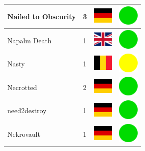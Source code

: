 \documentclass[12pt, a4paper, twoside]{report}
\begin{document}
\begin{center}
\begin{longtable}{|p{5cm}|p{2cm}|p{2cm}|p{2cm}|}
			Nailed to Obscurity & 3 & \includegraphics[width=1cm]{4x3/de} & \includegraphics[width=1cm]{likes/y} \\ \hline
			Napalm Death & 1 & \includegraphics[width=1cm]{4x3/gb} & \includegraphics[width=1cm]{likes/y} \\ \hline
			Nasty & 1 & \includegraphics[width=1cm]{4x3/be} & \includegraphics[width=1cm]{likes/m} \\ \hline
			Necrotted & 2 & \includegraphics[width=1cm]{4x3/de} & \includegraphics[width=1cm]{likes/y} \\ \hline
			need2destroy & 1 & \includegraphics[width=1cm]{4x3/de} & \includegraphics[width=1cm]{likes/y} \\ \hline
			Nekrovault & 1 & \includegraphics[width=1cm]{4x3/de} & \includegraphics[width=1cm]{likes/y} \\ \hline

\end{longtable}
\end{center}
\end{document}
